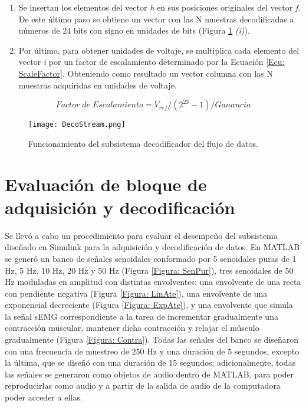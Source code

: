 \begin{enumerate}
	\item Se insertan los elementos del vector \emph{h} en sus posiciones originales del vector \emph{f}. De este último paso se obtiene un vector con las N muestras decodificadas a números de 24 bits con signo en unidades de bits (Figura \ref{Figura: DecoStream} \emph{(i)}).
	
	\item Por último, para  obtener unidades de voltaje, se multiplica cada elemento del vector \emph{i} por un factor de escalamiento determinado por la Ecuación \ref{Ecu: ScaleFactor}. Obteniendo como resultado un vector columna con las N muestras adquiridas en unidades de voltaje.
\end{enumerate}

\vfill
\begin{equation}
	Factor\; de\; Escalamiento = V_{ref}/(2^{23}-1)/Ganancia
	\label{Ecu: ScaleFactor}
\end{equation}
\vfill
\begin{figure}[htbb]
\centering
	\texttt{[image: DecoStream.png]}
	\caption{Funcionamiento del subsistema decodificador del flujo de datos.}
	\label{Figura: DecoStream}
\end{figure}
\vfill

\newpage
\section{Evaluación de bloque de adquisición y decodificación}\label{Sec: EvalAdquisicion}
Se llevó a cabo un procedimiento para evaluar el desempeño del subsistema diseñado en Simulink\textregistered \; para la adquisición y decodificación de datos. En MATLAB\textregistered \; se generó un banco de señales senoidales conformado por 5 senoidales puras de 1 Hz, 5 Hz, 10 Hz, 20 Hz y 50 Hz (Figura \ref{Figura: SenPur}), tres senoidales de 50 Hz moduladas en amplitud con distintas envolventes: 
una envolvente de una recta con pendiente negativa (Figura \ref{Figura: LinAte}), una envolvente de una exponencial decreciente (Figura \ref{Figura: ExpAte}), y una envolvente que simula la señal sEMG correspondiente a la tarea de incrementar gradualmente una contracción muscular, mantener dicha contracción y relajar el músculo gradualmente (Figura \ref{Figura: Contra}). Todas las señales del banco se diseñaron con una frecuencia de muestreo de 250 Hz y una duración de 5 segundos, excepto la última, que se diseñó con una duración de 15 segundos; adicionalmente, todas las señales se generaron como objetos de audio dentro de MATLAB\textregistered, para poder reproducirlas como audio y a partir de la salida de audio de la computadora poder acceder a ellas.

